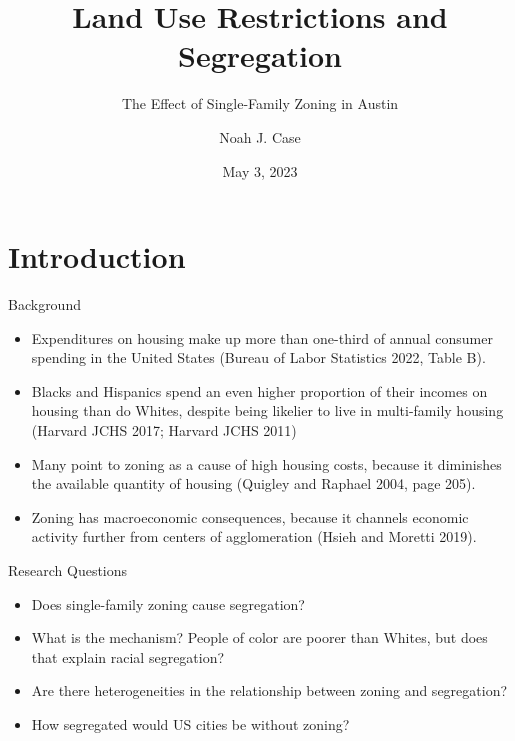 \documentclass{beamer}
\title{Land Use Restrictions and Segregation
}
\subtitle{The Effect of Single-Family Zoning in Austin}
\author{Noah J. Case}
\institute{Vassar College}
\date{May 3, 2023}
\begin{document}
\frame{\titlepage}

\section{Introduction}

\begin{frame}{Background}
    \begin{itemize}
        \item Expenditures on housing make up more than one-third of annual consumer spending in the United States (Bureau of Labor Statistics 2022, Table B).
        
        \item Blacks and Hispanics spend an even higher proportion of their incomes on housing than do Whites, despite being likelier to live in multi-family housing (Harvard JCHS 2017; Harvard JCHS 2011)
        
        \item Many point to zoning as a cause of high housing costs, because it diminishes the available quantity of housing (Quigley and Raphael
        2004, page 205).
        
        \item Zoning has macroeconomic consequences, because it channels economic activity further from centers of agglomeration (Hsieh and Moretti 2019).
    \end{itemize}
\end{frame}

\begin{frame}{Research Questions}
    \begin{itemize}
        \item Does single-family zoning cause segregation?
        \item What is the mechanism? People of color are poorer than Whites, but does that explain racial segregation?
        \item Are there heterogeneities in the relationship between zoning and segregation?
        \item How segregated would US cities be without zoning?
    \end{itemize}
\end{frame}
\end{document}
